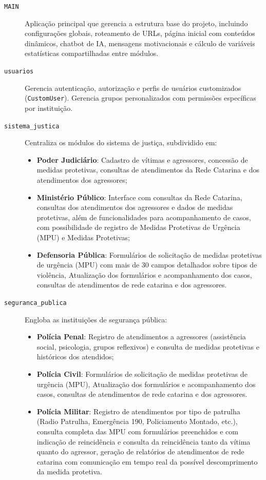 \begin{description}
   \item[\texttt{MAIN}] Aplicação principal que gerencia a estrutura base do projeto, incluindo configurações globais, roteamento de URLs, página inicial com conteúdos dinâmicos, chatbot de IA, mensagens motivacionais e cálculo de variáveis estatísticas compartilhadas entre módulos.
   
   \item[\texttt{usuarios}] Gerencia autenticação, autorização e perfis de usuários customizados (\texttt{CustomUser}). Gerencia grupos personalizados com permissões específicas por instituição.
   
   \item[\texttt{sistema\_justica}] Centraliza os módulos do sistema de justiça, subdividido em:
   \begin{itemize}
      \item \textbf{Poder Judiciário}: Cadastro de vítimas e agressores, concessão de medidas protetivas, consultas de atendimentos da Rede Catarina e dos atendimentos dos agressores;
      \item \textbf{Ministério Público}: Interface com consultas da Rede Catarina, consultas dos atendimentos dos agressores e dados de medidas protetivas, além de funcionalidades para acompanhamento de casos, com possibilidade de registro de Medidas Protetivas de Urgência (MPU) e Medidas Protetivas;
      \item \textbf{Defensoria Pública}: Formulários de solicitação de medidas protetivas de urgência (MPU) com mais de 30 campos detalhados sobre tipos de violência, Atualização dos formulários e acompanhamento dos casos, consultas de atendimentos de rede catarina e dos agressores.
   \end{itemize}
   
   \item[\texttt{seguranca\_publica}] Engloba as instituições de segurança pública:
   \begin{itemize}
      \item \textbf{Polícia Penal}: Registro de atendimentos a agressores (assistência social, psicologia, grupos reflexivos) e consulta de medidas protetivas e históricos dos atendidos;
      \item \textbf{Polícia Civil}: Formulários de solicitação de medidas protetivas de urgência (MPU), Atualização dos formulários e acompanhamento dos casos, consultas de atendimentos de rede catarina e dos agressores.
      \item \textbf{Polícia Militar}: Registro de atendimentos por tipo de patrulha (Radio Patrulha, Emergência 190, Policiamento Montado, etc.), consulta completa das MPU com formulários preenchidos e com indicação de reincidência e consulta da reincidência tanto da vítima quanto do agressor, geração de relatórios de atendimentos de rede catarina com comunicação em tempo real da possível descomprimento da medida protetiva.
   \end{itemize}
   

\end{description}
